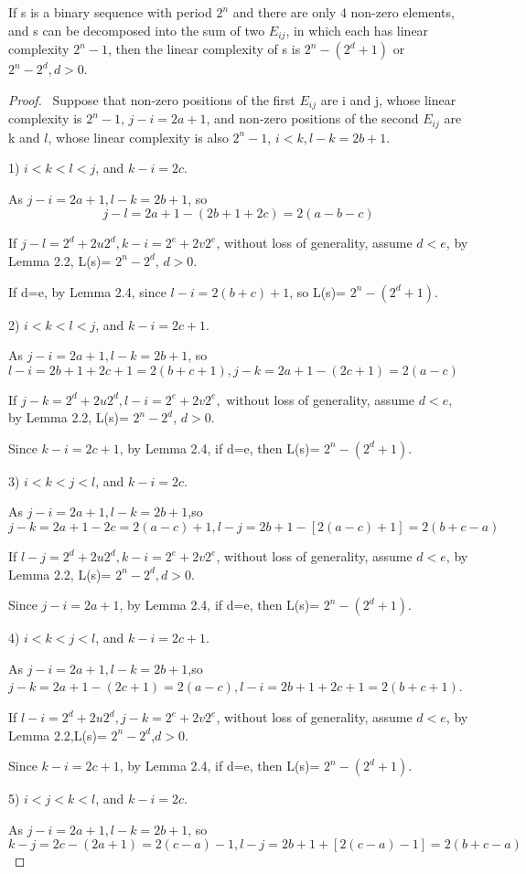 \documentclass[10pt,conference,twocolumn]{IEEEtran}
\begin{document}
 If s is a binary sequence with period
$2^n$ and there are only 4 non-zero elements, and s can be
decomposed into the sum of two $E_{ij}$, in which each has linear
complexity $2^n-1$, then the linear complexity of s is $2^n-(2^d+1)$
or $2^n-2^d, d>0$.

\begin{proof}\
 Suppose that non-zero positions of the first $E_{ij}$ are i and j, whose linear complexity is $2^n-1$, $j-i=2a+1$,
 and non-zero positions of the second $E_{ij}$ are k and $l$, whose linear complexity is also $2^n-1$, $i<k, l-k=2b+1$.

 1) $i<k<l<j$, and $k-i=2c$.

As $j-i=2a+1,l-k=2b+1$, so $$j-l=2a+1-(2b+1+2c)=2(a-b-c)$$

If $j-l=2^d+2u2^d, k-i=2^e+2v2^e$, without loss of generality,
assume $d<e$, by Lemma 2.2, L(s)= $2^n-2^d$, $d>0$.

 If d=e, by Lemma 2.4, since
$l-i=2(b+c)+1$, so L(s)= $2^n-(2^d+1)$.

2) $i<k<l<j$, and $k-i=2c+1$.

As $j-i=2a+1,l-k=2b+1$, so $l-i=2b+1+2c+1=2(b+c+1),
j-k=2a+1-(2c+1)=2(a-c)$

 If $j-k=2^d+2u2^d, l-i=2^e+2v2^e,$ without loss of
generality, assume $d<e$, by Lemma 2.2, L(s)= $2^n-2^d$, $d>0$.

Since $k-i=2c+1$, by Lemma 2.4, if d=e, then L(s)= $2^n-(2^d+1)$.

3) $i<k<j<l$, and $k-i=2c$.

As $j-i=2a+1,l-k=2b+1$,so $j-k=2a+1-2c=2(a-c)+1,
l-j=2b+1-[2(a-c)+1]=2(b+c-a)$

If $l-j=2^d+2u2^d, k-i=2^e+2v2^e$, without loss of generality,
assume $d<e$, by Lemma 2.2, L(s)= $2^n-2^d,d>0$.

Since $j-i=2a+1$, by Lemma 2.4, if d=e, then L(s)= $2^n-(2^d+1)$.

4) $i<k<j<l$, and $k-i=2c+1$.

As $j-i=2a+1,l-k=2b+1$,so $j-k=2a+1-(2c+1)=2(a-c),
l-i=2b+1+2c+1=2(b+c+1)$.

 If $l-i=2^d+2u2^d, j-k=2^e+2v2^e$, without loss
of generality, assume $d<e$, by Lemma 2.2,L(s)= $2^n-2^d$,$d>0$.

Since $k-i=2c+1$, by Lemma 2.4, if d=e, then L(s)= $2^n-(2^d+1)$.

5) $i<j<k<l$, and $k-i=2c$.

As $j-i=2a+1,l-k=2b+1$, so $k-j=2c-(2a+1)=2(c-a)-1,
l-j=2b+1+[2(c-a)-1]=2(b+c-a)$


\end{proof}
\end{document}
